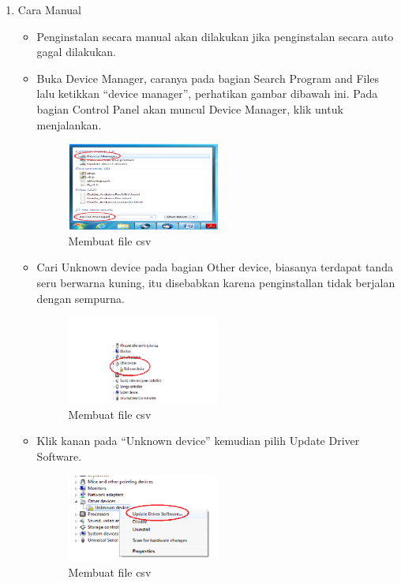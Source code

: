 \begin{enumerate}
    \item Cara Manual

    \begin{itemize}
        \item Penginstalan secara manual akan dilakukan jika penginstalan secara auto gagal dilakukan.
        \item Buka Device Manager, caranya pada bagian Search Program and Files lalu ketikkan “device manager”, perhatikan gambar dibawah ini. Pada bagian Control Panel akan muncul Device Manager, klik untuk menjalankan.
            \begin{figure}[H]	
                \includegraphics[width=5cm]{figures/5/1174003/teori/3.png}
                \centering
                \caption{Membuat file csv}
            \end{figure}

        \item Cari Unknown device pada bagian Other device, biasanya terdapat tanda seru berwarna kuning, itu disebabkan karena penginstallan tidak berjalan dengan sempurna.
        \begin{figure}[H]	
            \includegraphics[width=5cm]{figures/5/1174003/teori/4.png}
            \centering
            \caption{Membuat file csv}
        \end{figure}

        \item Klik kanan pada “Unknown device” kemudian pilih Update Driver Software.
        \begin{figure}[H]	
            \includegraphics[width=5cm]{figures/5/1174003/teori/5.png}
            \centering
            \caption{Membuat file csv}
        \end{figure}


\end{itemize}
\end{enumerate}
